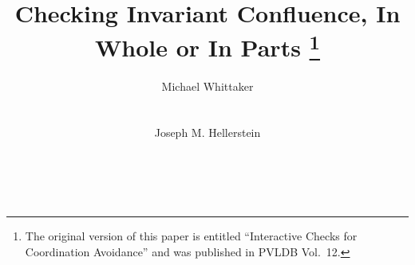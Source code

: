 \documentclass{research4cacm}
\begin{document}
\title{%
  Checking Invariant Confluence, In Whole or In Parts%
  \thanks{%
    The original version of this paper is entitled ``Interactive Checks for
    Coordination Avoidance'' and was published in PVLDB Vol.\ 12.
  }%
}

\author{
\alignauthor
Michael Whittaker\\
       \\
       \\
\alignauthor
Joseph M. Hellerstein\\
       \\
       \\
}

\maketitle

{}
{}
{}
{}
{}
{}
{}
{}
{}
{}


\balancecolumns
\end{document}
